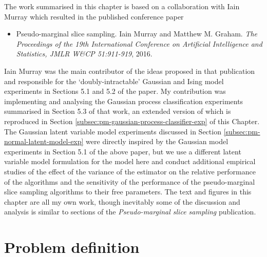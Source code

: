 The work summarised in this chapter is based on a collaboration with Iain Murray which resulted in the published conference paper
\begin{itemize}
 \item Pseudo-marginal slice sampling. Iain Murray and Matthew M. Graham. \emph{The Proceedings of the 19th International Conference on Artificial Intelligence and Statistics, JMLR W\&CP 51:911-919}, 2016.
\end{itemize}
Iain Murray was the main contributor of the ideas proposed in that publication and responsible for the `doubly-intractable' Gaussian and Ising model experiments in Sections 5.1 and 5.2 of the paper. My contribution was implementing and analysing the Gaussian process classification experiments summarised in Section 5.3 of that work, an extended version of which is reproduced in Section \ref{subsec:pm-gaussian-process-classifier-exp} of this Chapter. The Gaussian latent variable model experiments discussed in Section \ref{subsec:pm-normal-latent-model-exp} were directly inspired by the Gaussian model experiments in Section 5.1 of the above paper, but we use a different latent variable model formulation for the model here and conduct additional empirical studies of the effect of the variance of the estimator on the relative performance of the algorithms and the sensitivity of the performance of the pseudo-marginal slice sampling algorithms to their free parameters. The text and figures in this chapter are all my own work, though inevitably some of the discussion and analysis is similar to sections of the \emph{Pseudo-marginal slice sampling} publication.


\section{Problem definition}

